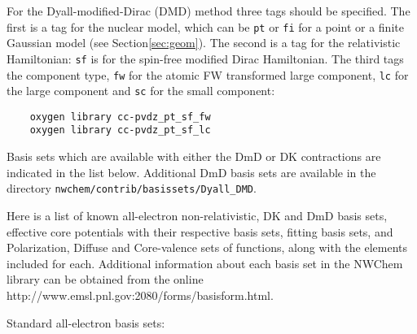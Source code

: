 For the Dyall-modified-Dirac (DMD) method three tags should be specified. The 
first is a tag for the nuclear model, which can be \verb+pt+ or \verb+fi+ for 
a point or a finite Gaussian model (see Section\ref{sec:geom}).  The second 
is a tag for the relativistic Hamiltonian: \verb+sf+ is for the spin-free 
modified Dirac Hamiltonian. The third tags the component type, \verb+fw+ for 
the atomic FW transformed large component, \verb+lc+ for the large component 
and \verb+sc+ for the small component: 
\begin{verbatim}
    oxygen library cc-pvdz_pt_sf_fw
    oxygen library cc-pvdz_pt_sf_lc
\end{verbatim} 
Basis sets which are available with either the DmD or DK contractions are
indicated in the list below. Additional DmD basis sets are available in the
directory \verb#nwchem/contrib/basissets/Dyall_DMD#.

\sloppy
Here is a list of known all-electron non-relativistic, DK and DmD basis sets, 
effective core potentials with their respective basis sets, fitting basis sets, 
and Polarization, Diffuse and Core-valence sets of functions,
along with the elements included for each. Additional information about each 
basis set in the NWChem library can be obtained from the online 
{http://www.emsl.pnl.gov:2080/forms/basisform.html}.

Standard all-electron basis sets:

